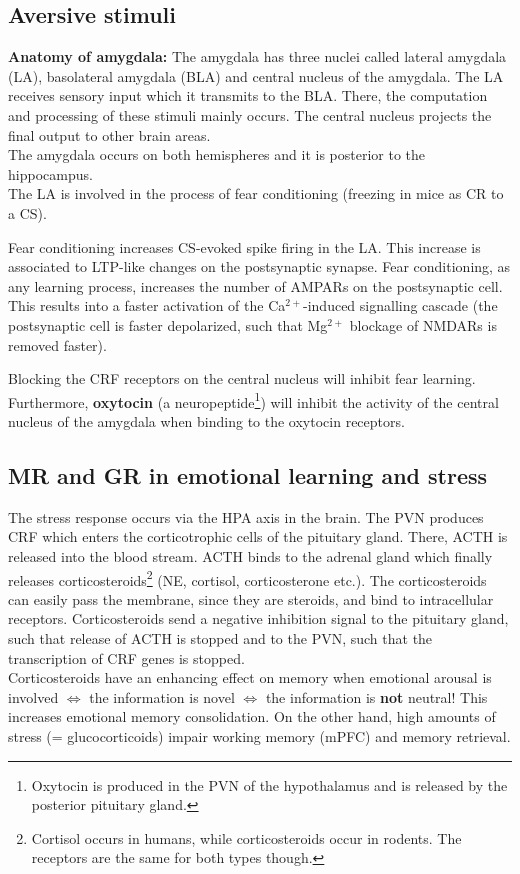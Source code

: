 \documentclass[twosided, a4paper, pt11]{article}
\begin{document}
	\subsection{Aversive stimuli}
	\textbf{Anatomy of amygdala:} The amygdala has three nuclei called lateral amygdala (LA), basolateral amygdala (BLA) and central nucleus of the amygdala. The LA receives sensory input which it transmits to the BLA. There, the computation and processing of these stimuli mainly occurs. The central nucleus projects the final output to other brain areas.\\
	The amygdala occurs on both hemispheres and it is posterior to the hippocampus.\\
	The LA is involved in the process of fear conditioning (freezing in mice as CR to a CS).\newline
	
	Fear conditioning increases CS-evoked spike firing in the LA. This increase is associated to LTP-like changes on the postsynaptic synapse. Fear conditioning, as any learning process, increases the number of AMPARs on the postsynaptic cell. This results into a faster activation of the Ca$^{2+}$-induced signalling cascade (the postsynaptic cell is faster depolarized, such that Mg$^{2+}$ blockage of NMDARs is removed faster).\newline
	
	Blocking the CRF receptors on the central nucleus will inhibit fear learning. Furthermore, \textbf{oxytocin} (a neuropeptide\footnote{Oxytocin is produced in the PVN of the hypothalamus and is released by the posterior pituitary gland.}) will inhibit the activity of the central nucleus of the amygdala when binding to the oxytocin receptors.
	
	\subsection{MR and GR in emotional learning and stress}
	The stress response occurs via the HPA axis in the brain. The PVN produces CRF which enters the corticotrophic cells of the pituitary gland. There, ACTH is released into the blood stream. ACTH binds to the adrenal gland which finally releases corticosteroids\footnote{Cortisol occurs in humans, while corticosteroids occur in rodents. The receptors are the same for both types though.} (NE, cortisol, corticosterone etc.). The corticosteroids can easily pass the membrane, since they are steroids, and bind to intracellular receptors. Corticosteroids send a negative inhibition signal to the pituitary gland, such that release of ACTH is stopped and to the PVN, such that the transcription of CRF genes is stopped.\\
	Corticosteroids have an enhancing effect on memory when emotional arousal is involved $\Leftrightarrow$ the information is novel $\Leftrightarrow$ the information is \textbf{not} neutral! This increases emotional memory consolidation. On the other hand, high amounts of stress (= glucocorticoids) impair working memory (mPFC) and memory retrieval.
	
\end{document}
